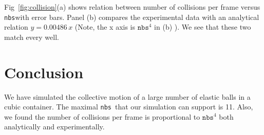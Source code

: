 \documentclass[twoside,11pt]{article}
\newcommand{\nbs}{\texttt{nbs}}
\begin{document}
Fig~\ref{fig:collision}(a) shows relation between number of collisions 
per frame versus \nbs with error bars. Panel (b) compares the experimental
data with an analytical relation $ y = 0.00486 \, x$ (Note, the x axis is
$\nbs^4$ in (b) ). We see that these two match every well.


\section{Conclusion}
We have simulated the collective motion of a large number of 
elastic balls in a
cubic container. The maximal \nbs\ that our simulation
can support is 11. Also, we found the
number of collisions per frame is proportional to $\nbs^4$ both
analytically and experimentally. 

%
%
%
%
\end{document}
